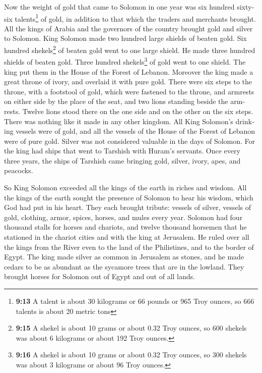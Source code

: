 \begin{paracol}{2}
\begin{otherlanguage}{english}
 Now the weight of gold that came to Solomon in one year
was six hundred sixty-six talents\footnote{\textbf{9:13} A talent is
  about 30 kilograms or 66 pounds or 965 Troy ounces, so 666 talents is
  about 20 metric tons} of gold,  in addition to that
which the traders and merchants brought. All the kings of Arabia and the
governors of the country brought gold and silver to Solomon.
 King Solomon made two hundred large shields of beaten
gold. Six hundred shekels\footnote{\textbf{9:15} A shekel is about 10
  grams or about 0.32 Troy ounces, so 600 shekels was about 6 kilograms
  or about 192 Troy ounces.} of beaten gold went to one large shield.
 He made three hundred shields of beaten gold. Three
hundred shekels\footnote{\textbf{9:16} A shekel is about 10 grams or
  about 0.32 Troy ounces, so 300 shekels was about 3 kilograms or about
  96 Troy ounces.} of gold went to one shield. The king put them in the
House of the Forest of Lebanon.  Moreover the king made a
great throne of ivory, and overlaid it with pure gold. 
There were six steps to the throne, with a footstool of gold, which were
fastened to the throne, and armrests on either side by the place of the
seat, and two lions standing beside the armrests.  Twelve
lions stood there on the one side and on the other on the six steps.
There was nothing like it made in any other kingdom.  All
King Solomon's drinking vessels were of gold, and all the vessels of the
House of the Forest of Lebanon were of pure gold. Silver was not
considered valuable in the days of Solomon.  For the king
had ships that went to Tarshish with Huram's servants. Once every three
years, the ships of Tarshish came bringing gold, silver, ivory, apes,
and peacocks.

 So King Solomon exceeded all the kings of the earth in
riches and wisdom.  All the kings of the earth sought the
presence of Solomon to hear his wisdom, which God had put in his heart.
 They each brought tribute: vessels of silver, vessels of
gold, clothing, armor, spices, horses, and mules every year.
 Solomon had four thousand stalls for horses and
chariots, and twelve thousand horsemen that he stationed in the chariot
cities and with the king at Jerusalem.  He ruled over all
the kings from the River even to the land of the Philistines, and to the
border of Egypt.  The king made silver as common in
Jerusalem as stones, and he made cedars to be as abundant as the
sycamore trees that are in the lowland.  They brought
horses for Solomon out of Egypt and out of all lands.


\end{otherlanguage}
\end{paracol}
